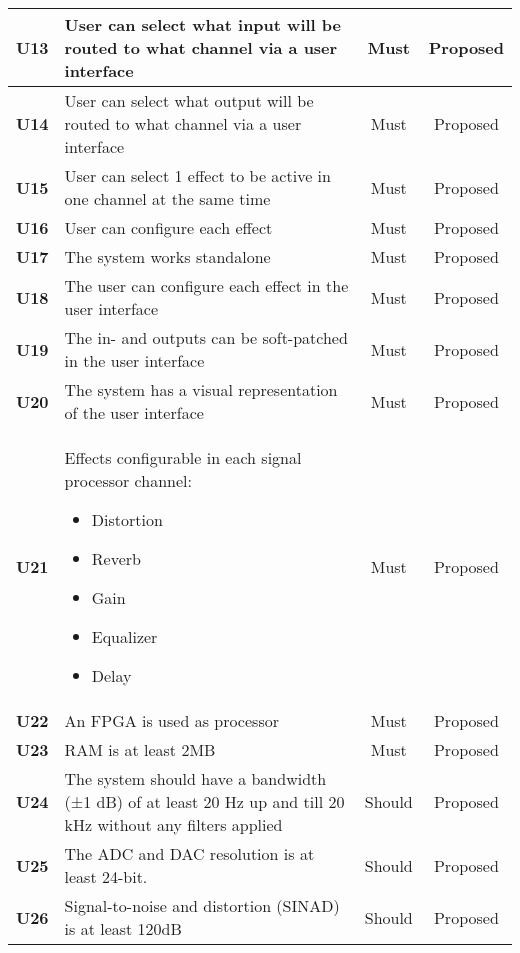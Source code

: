 \begin{longtable}{|c|p{10cm}|c|c|}
	\textbf{U13}&User can select what input will be routed to what channel via a user interface									& Must   & Proposed\\ \hline
	\textbf{U14}&User can select what output will be routed to what channel via a user interface								& Must   & Proposed\\ \hline
	\textbf{U15}&User can select 1 effect to be active in one channel at the same time											& Must   & Proposed\\ \hline
	\textbf{U16}&User can configure each effect															 						& Must   & Proposed\\ \hline
	\textbf{U17}&The system works standalone																					& Must   & Proposed\\ \hline
	\textbf{U18}&The user can configure each effect in the user interface														& Must   & Proposed\\ \hline
	\textbf{U19}&The in- and outputs can be soft-patched in the user interface													& Must   & Proposed\\ \hline
	\textbf{U20}&The system has a visual representation of the user interface													& Must   & Proposed\\ \hline
	\textbf{U21}&Effects configurable in each signal processor channel: \newline
	\begin{itemize}
		\setlength\itemsep{-0.4em}
		\item Distortion
		\item Reverb
		\item Gain
		\item Equalizer
		\item Delay
	\end{itemize}																												& Must 	 & Proposed\\ \hline
	\textbf{U22} &An FPGA is used as processor																 					& Must   & Proposed\\ \hline
	\textbf{U23} &RAM is at least 2MB																		 					& Must   & Proposed\\ \hline
	\textbf{U24} &The system should have a bandwidth (±1 dB) of at least 20 Hz up and till 20 kHz without any filters applied 	& Should & Proposed\\ \hline
	\textbf{U25} &The ADC and DAC resolution is at least 24-bit.																& Should & Proposed\\ \hline
	\textbf{U26} &Signal-to-noise and distortion (SINAD) is at least 120dB 														& Should & Proposed\\ \hline

\end{longtable}
